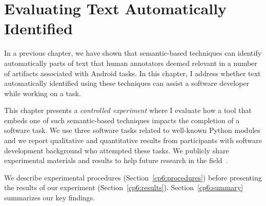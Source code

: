 \setcounter{chapter}{5}
\setcounter{rq}{1}


\chapter{Evaluating Text Automatically Identified}
\label{ch:assisting}



In a previous chapter, we have shown that semantic-based techniques can identify automatically parts of  text 
that human annotators deemed relevant in a number of artifacts associated with Android tasks. In this chapter,
I  address whether  text automatically identified using these
techniques can assist a software developer while working on a task.

This chapter presents a \textit{controlled experiment}
where I evaluate how a tool that embeds one of such semantic-based techniques impacts the completion of a software task.
We use three software tasks related to well-known Python modules and
we report qualitative and quantitative results from  participants with software development background who attempted these tasks. 
We publicly share experimental materials and results to help future research in the field~\cite{experiment_material}.


We describe experimental procedures (Section~\ref{cp6:procedures}) before
presenting the results of our experiment (Section~\ref{cp6:results}). Section~\ref{cp6:summary} summarizes our key findings.












